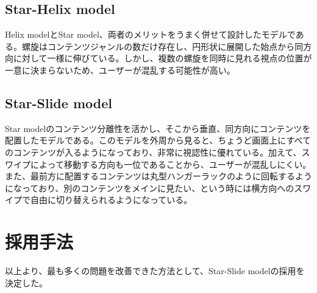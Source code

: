 \subsection{Star-Helix model}
Helix modelとStar model、両者のメリットをうまく併せて設計したモデルである。螺旋はコンテンツジャンルの数だけ存在し、円形状に展開した始点から同方向に対して一様に伸びている。しかし、複数の螺旋を同時に見れる視点の位置が一意に決まらないため、ユーザーが混乱する可能性が高い。

\subsection{Star-Slide model}
Star modelのコンテンツ分離性を活かし、そこから垂直、同方向にコンテンツを配置したモデルである。このモデルを外周から見ると、ちょうど画面上にすべてのコンテンツが入るようになっており、非常に視認性に優れている。加えて、スワイプによって移動する方向も一位であることから、ユーザーが混乱しにくい。また、最前方に配置するコンテンツは丸型ハンガーラックのように回転するようになっており、別のコンテンツをメインに見たい、という時には横方向へのスワイプで自由に切り替えられるようになっている。

\section{採用手法}
以上より、最も多くの問題を改善できた方法として、Star-Slide modelの採用を決定した。